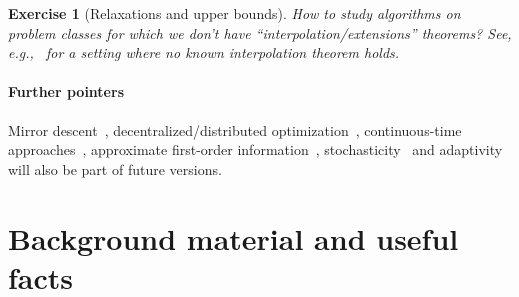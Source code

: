 \documentclass[11pt,a4paper]{article}
\newtheorem{exercise}{Exercise}
\begin{document}
	\begin{exercise}[Relaxations and upper bounds] How to study algorithms on problem classes for which we don't have ``interpolation/extensions'' theorems? See, e.g.,~\cite{gorbunov2022last} for a setting where no known interpolation theorem holds.
	\end{exercise}
	
\paragraph{Further pointers} Mirror descent~\cite{Dragomir2019optimal}, decentralized/distributed optimization~\cite{sundararajan2017robust,sundararajan2020analysis,colla2021automated,colla2022automatic}, continuous-time approaches~\cite{fazlyab2018analysis,moucer2022systematic}, approximate first-order information~\cite{taylor2015exact,deKlerkELS2016,Barre2020inexact}, stochasticity~\cite{hu2017unified,pmlr-v99-taylor19a,hu2021analysis} and adaptivity~\cite{deKlerkELS2016,Barre2020Polyak} will also be part of future versions.
	
	\section{Background material and useful facts}			%
	\label{sec:background}
\end{document}
